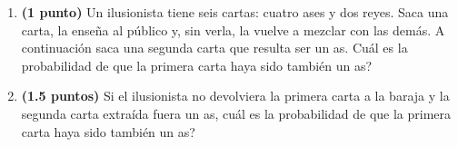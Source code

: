 
\begin{enumerate}[label=\alph*)]
\item \textbf{(1 punto)} Un ilusionista tiene seis cartas: cuatro ases y dos reyes. Saca una carta, la enseña al público y, sin verla, la vuelve a mezclar con las demás. A continuación saca una segunda carta que resulta ser un as. \textquestiondown{}Cuál es la probabilidad de que la primera carta haya sido también un as?
\item \textbf{(1.5 puntos)} Si el ilusionista no devolviera la primera carta a la baraja y la segunda carta extraída fuera un as, \textquestiondown{}cuál es la probabilidad de que la primera carta haya sido también un as?
\end{enumerate}
